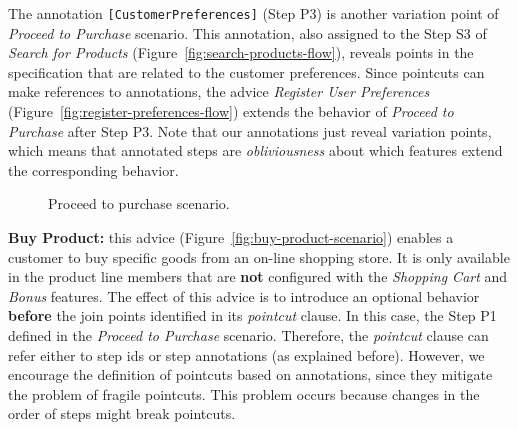 \documentclass{sig-alternate}
\begin{document}
The annotation \mbox{\texttt{[CustomerPreferences]}} (Step P3) is
another variation point of \emph{Proceed to Purchase} scenario. This annotation, also assigned to the Step S3 of \emph{Search for Products} (Figure~\ref{fig:search-products-flow}), reveals points in the specification that are related to the customer preferences. Since pointcuts can make references to annotations, the advice \emph{Register User Preferences} (Figure~\ref{fig:register-preferences-flow}) extends the behavior of \emph{Proceed to Purchase} after Step P3. Note that our annotations just reveal variation points, which means that annotated steps are \emph{obliviousness} about which features extend the corresponding behavior. 


\begin{figure}[h]
\caption{Proceed to purchase scenario.}
\label{fig:proceed-to-checkout}
\end{figure}

{\bf Buy Product:} this advice (Figure~\ref{fig:buy-product-scenario}) enables a
customer to buy specific goods from an on-line shopping store. It is only
available in the product line members that are {\bf not} configured with the
\emph{Shopping Cart} and \emph{Bonus} features. The effect of this advice is to
introduce an optional behavior {\bf before} the join points identified in its
\emph{pointcut} clause. In this case, the Step P1 defined in the \emph{Proceed to
Purchase} scenario. Therefore, the \emph{pointcut} clause can refer either to step ids or
step annotations (as explained before). However, we encourage the definition of
pointcuts based on annotations, since they mitigate the problem
of fragile pointcuts. This problem occurs because changes in the order of
steps might break pointcuts.
 
\end{document}
